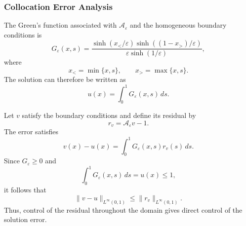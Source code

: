 \documentclass[11pt, onecolumn]{report}
\begin{document}
\subsubsection{Collocation Error Analysis}

The Green's function associated with \(\mathcal A_\varepsilon\) and the homogeneous boundary conditions is
\begin{equation}
    G_\varepsilon(x,s)
    =
    \frac{
        \sinh\left(x_{<}/\varepsilon\right)
        \sinh\left((1-x_{>})/\varepsilon\right)
    }{
        \varepsilon\sinh(1/\varepsilon)
    },
    \label{eq:toy_green_function}
\end{equation}
where
\begin{equation*}
    x_{<}=\min\{x,s\},
    \qquad
    x_{>}=\max\{x,s\}.
\end{equation*}
The solution can therefore be written as
\begin{equation*}
    u(x)=\int_0^1G_\varepsilon(x,s)\,ds.
\end{equation*}

Let \(v\) satisfy the boundary conditions and define its residual by
\begin{equation*}
    r_v=\mathcal A_\varepsilon v-1.
\end{equation*}
The error satisfies
\begin{equation}
    v(x)-u(x)
    =
    \int_0^1G_\varepsilon(x,s)r_v(s)\,ds.
    \label{eq:green_error_representation}
\end{equation}
Since \(G_\varepsilon\geq0\) and
\begin{equation*}
    \int_0^1G_\varepsilon(x,s)\,ds
    =
    u(x)\leq1,
\end{equation*}
it follows that
\begin{equation}
    \|v-u\|_{L^\infty(0,1)}
    \leq
    \|r_v\|_{L^\infty(0,1)}.
    \label{eq:continuous_residual_stability}
\end{equation}
Thus, control of the residual throughout the domain gives direct control of the solution error.
\end{document}
